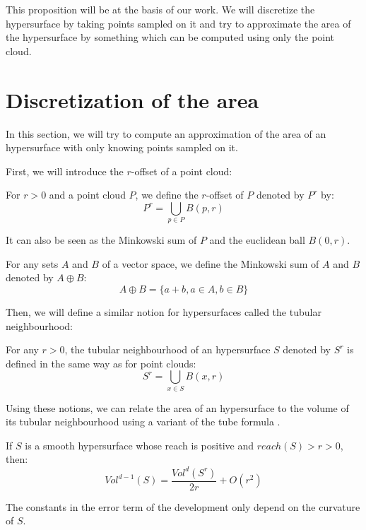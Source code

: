 This proposition will be at the basis of our work. We will discretize the
hypersurface by taking points sampled on it and try to approximate the area of
the hypersurface by something which can be computed using only the point cloud.

\section{Discretization of the area}

In this section, we will try to compute an approximation of the area of an
hypersurface with only knowing points sampled on it.

First, we will introduce the $r$-offset of a point cloud:

\begin{definition}
    For $ r > 0 $ and a point cloud $ P $, we define the $r$-offset of $ P $
    denoted by $ P^r $ by:
    $$ P^r = \bigcup_{p \in P} B(p, r)$$
\end{definition}

It can also be seen as the Minkowski sum of $ P $ and the euclidean ball $ B(0,
r) $.

\begin{definition}
    For any sets $ A $ and $ B $ of a vector space, we define the Minkowski sum
    of $ A $ and $ B $ denoted by $ A \oplus B $:
    $$ A \oplus B = \{ a + b, a \in A, b \in B \} $$
    \label{def:minkowski-sum}
\end{definition}

Then, we will define a similar notion for hypersurfaces called the tubular
neighbourhood:

\begin{definition}
    For any $ r > 0 $, the tubular neighbourhood of an hypersurface $ S $
    denoted by $ S^r $ is defined in the same way as for point clouds:
    $$ S^r = \bigcup_{x \in S} B(x, r) $$
\end{definition}

Using these notions, we can relate the area of an hypersurface to the volume of
its tubular neighbourhood using a variant of the tube formula \cite{weyl1939volume}.

\begin{proposition}
    \label{prop:comp-offset-area}
    If $ S $ is a smooth hypersurface whose reach is positive and $ reach(S) > r
    > 0 $, then: $$ Vol^{d-1}(S) = \frac{Vol^d(S^r)}{2r} + O(r^2) $$

    The constants in the error term of the development only depend on the curvature
    of $ S $.
\end{proposition}

